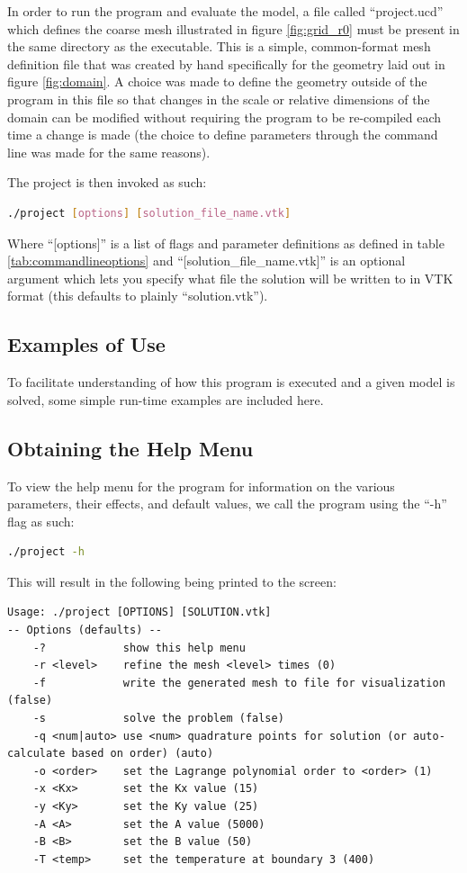 \documentclass[letterpaper,10pt]{article}
\begin{document}
In order to run the program and evaluate the model, a file called ``project.ucd'' which defines the coarse mesh illustrated in figure \ref{fig:grid_r0} must be present in the same directory as the executable. This is a simple, common-format mesh definition file that was created by hand specifically for the geometry laid out in figure \ref{fig:domain}. A choice was made to define the geometry outside of the program in this file so that changes in the scale or relative dimensions of the domain can be modified without requiring the program to be re-compiled each time a change is made (the choice to define parameters through the command line was made for the same reasons).

The project is then invoked as such:
\vspace{-6mm}
\begin{lstlisting}[numbers=none,frame=none,language=bash]
./project [options] [solution_file_name.vtk]
\end{lstlisting}
\vspace{1mm}

Where ``[options]'' is a list of flags and parameter definitions as defined in table \ref{tab:commandlineoptions} and ``[solution\_file\_name.vtk]'' is an optional argument which lets you specify what file the solution will be written to in VTK format (this defaults to plainly ``solution.vtk'').

\subsection{Examples of Use}
To facilitate understanding of how this program is executed and a given model is solved, some simple run-time examples are included here.

\subsection{Obtaining the Help Menu}
To view the help menu for the program for information on the various parameters, their effects, and default values, we call the program using the ``-h'' flag as such:
\vspace{-6mm}
\begin{lstlisting}[numbers=none,frame=none,language=bash]
./project -h
\end{lstlisting}
\vspace{1mm}

This will result in the following being printed to the screen:
\begin{verbatim}
Usage: ./project [OPTIONS] [SOLUTION.vtk]
-- Options (defaults) --
    -?            show this help menu
    -r <level>    refine the mesh <level> times (0)
    -f            write the generated mesh to file for visualization (false)
    -s            solve the problem (false)
    -q <num|auto> use <num> quadrature points for solution (or auto-calculate based on order) (auto)
    -o <order>    set the Lagrange polynomial order to <order> (1)
    -x <Kx>       set the Kx value (15)
    -y <Ky>       set the Ky value (25)
    -A <A>        set the A value (5000)
    -B <B>        set the B value (50)
    -T <temp>     set the temperature at boundary 3 (400)
\end{verbatim}
\end{document}
